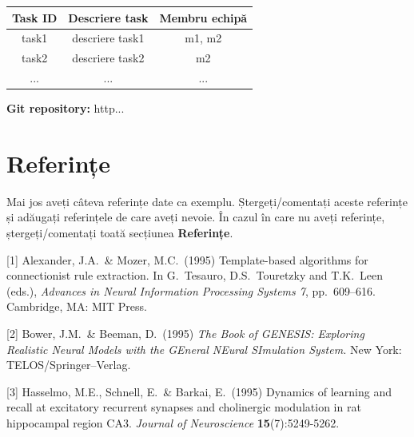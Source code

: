 \documentclass{article}
\begin{document}
\begin{center}
\begin{tabular}{ |c|c|c| } 
 \hline
 \textbf{Task ID} & \textbf{Descriere task} & \textbf{Membru echipă} \\ 
  \hline
 task1 & descriere task1 &  m1, m2 \\ 
  \hline
 task2 & descriere task2 &  m2 \\ 
 \hline
 ... & ... & ... \\ 
 \hline
\end{tabular}
\end{center}

\textbf{Git repository:} http...

\section*{Referințe}

\medskip

\small
\color{red}
Mai jos aveți câteva referințe date ca exemplu. Ștergeți/comentați aceste referințe și adăugați referințele de care aveți nevoie. În cazul în care nu aveți referințe, ștergeți/comentați toată secțiunea \textbf{Referințe}.

\color{black}
[1] Alexander, J.A.\ \& Mozer, M.C.\ (1995) Template-based algorithms for
connectionist rule extraction. In G.\ Tesauro, D.S.\ Touretzky and T.K.\ Leen
(eds.), {\it Advances in Neural Information Processing Systems 7},
pp.\ 609--616. Cambridge, MA: MIT Press.

[2] Bower, J.M.\ \& Beeman, D.\ (1995) {\it The Book of GENESIS: Exploring
  Realistic Neural Models with the GEneral NEural SImulation System.}  New York:
TELOS/Springer--Verlag.

[3] Hasselmo, M.E., Schnell, E.\ \& Barkai, E.\ (1995) Dynamics of learning and
recall at excitatory recurrent synapses and cholinergic modulation in rat
hippocampal region CA3. {\it Journal of Neuroscience} {\bf 15}(7):5249-5262.
\end{document}
